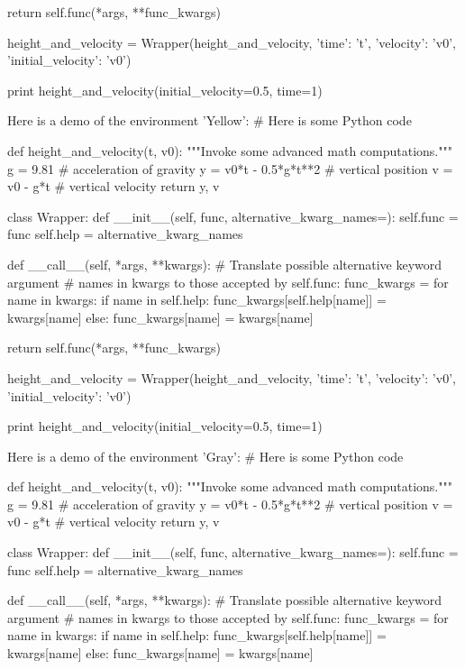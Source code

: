         return self.func(*args, **func_kwargs)

height_and_velocity = Wrapper(height_and_velocity,
                              {'time': 't',
                               'velocity': 'v0',
                               'initial_velocity': 'v0'})

print height_and_velocity(initial_velocity=0.5, time=1)


\noindent
Here is a demo of the environment 'Yellow':
# Here is some Python code

def height_and_velocity(t, v0):
    """Invoke some advanced math computations."""
    g = 9.81                  # acceleration of gravity
    y = v0*t - 0.5*g*t**2     # vertical position
    v = v0 - g*t              # vertical velocity
    return y, v

class Wrapper:
    def __init__(self, func, alternative_kwarg_names={}):
        self.func = func
        self.help = alternative_kwarg_names

    def __call__(self, *args, **kwargs):
        # Translate possible alternative keyword argument
        # names in kwargs to those accepted by self.func:
        func_kwargs = {}
        for name in kwargs:
            if name in self.help:
                func_kwargs[self.help[name]] = kwargs[name]
            else:
                func_kwargs[name] = kwargs[name]

        return self.func(*args, **func_kwargs)

height_and_velocity = Wrapper(height_and_velocity,
                              {'time': 't',
                               'velocity': 'v0',
                               'initial_velocity': 'v0'})

print height_and_velocity(initial_velocity=0.5, time=1)


\noindent
Here is a demo of the environment 'Gray':
# Here is some Python code

def height_and_velocity(t, v0):
    """Invoke some advanced math computations."""
    g = 9.81                  # acceleration of gravity
    y = v0*t - 0.5*g*t**2     # vertical position
    v = v0 - g*t              # vertical velocity
    return y, v

class Wrapper:
    def __init__(self, func, alternative_kwarg_names={}):
        self.func = func
        self.help = alternative_kwarg_names

    def __call__(self, *args, **kwargs):
        # Translate possible alternative keyword argument
        # names in kwargs to those accepted by self.func:
        func_kwargs = {}
        for name in kwargs:
            if name in self.help:
                func_kwargs[self.help[name]] = kwargs[name]
            else:
                func_kwargs[name] = kwargs[name]

